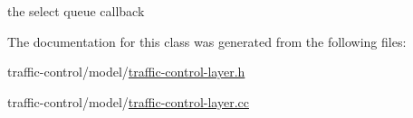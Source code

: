 the select queue callback 



The documentation for this class was generated from the following files\+:\begin{DoxyCompactItemize}
\item 
traffic-\/control/model/\hyperlink{traffic-control-layer_8h}{traffic-\/control-\/layer.\+h}\item 
traffic-\/control/model/\hyperlink{traffic-control-layer_8cc}{traffic-\/control-\/layer.\+cc}\end{DoxyCompactItemize}
